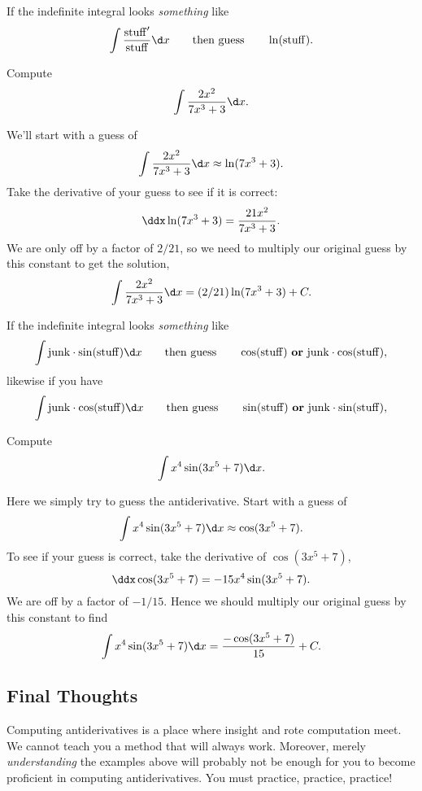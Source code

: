 \begin{template}\label{template:lnchain}
If the indefinite integral looks \emph{something} like
\[
\int \frac{\mathrm{stuff}'}{\mathrm{stuff}}\d x \qquad\text{then guess}\qquad\ln(\mathrm{stuff}).
\]
\end{template}

\begin{example}
Compute
\[
\int \frac{2x^2}{7x^3 + 3} \d x.
\]
\end{example}

\begin{solution} We'll start with a guess of
\[
\int \frac{2x^2}{7x^3 + 3} \d x \approx \ln(7x^3+3).
\]
Take the derivative of your guess to see if it is correct:
\[
\ddx \ln(7x^3+3) = \frac{21x^2}{7x^3 + 3}.
\]
We are only off by a factor of $2/21$, so we need to multiply our
original guess by this constant to get the solution,
\[
\int \frac{2x^2}{7x^3 + 3} \d x = (2/21)\ln(7x^3+3)+C.
\]
\end{solution}




\begin{template}\label{template:trigchain}
If the indefinite integral looks \emph{something} like
\[
\int \mathrm{junk}\cdot \sin(\mathrm{stuff}) \d x \qquad\text{then
  guess}\qquad \cos(\mathrm{stuff}) \text{ \textbf{or} }\mathrm{junk}
\cdot \cos(\mathrm{stuff}),
\]
likewise if you have 
\[
\int \mathrm{junk}\cdot \cos(\mathrm{stuff}) \d x \qquad\text{then
  guess}\qquad \sin(\mathrm{stuff}) \text{ \textbf{or} }\mathrm{junk}
\cdot \sin(\mathrm{stuff}),
\]
\end{template}



\begin{example}
Compute
\[
\int x^4\sin(3x^5+7) \d x.
\]
\end{example}


\begin{solution}
Here we simply try to guess the antiderivative. Start with a guess of
\[
\int x^4\sin(3x^5+7)\d x \approx \cos(3x^5+7).
\]
To see if your guess is correct, take the derivative of $\cos(3x^5+7)$,
\[
\ddx \cos(3x^5+7) = -15x^4\sin(3x^5+7).
\]
We are off by a factor of $-1/15$. Hence we should multiply our
original guess by this constant to find
\[
\int x^4\sin(3x^5+7) \d x = \frac{-\cos(3x^5+7)}{15} + C.
\]
\end{solution}





\subsection*{Final Thoughts}
Computing antiderivatives is a place where insight and rote
computation meet. We cannot teach you a method that will always
work. Moreover, merely \emph{understanding} the examples above will
probably not be enough for you to become proficient in computing
antiderivatives. You must practice, practice, practice!



